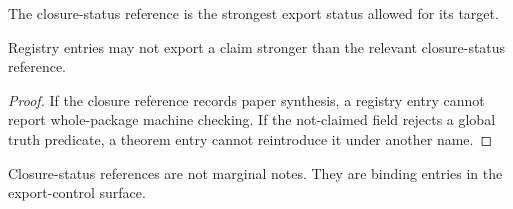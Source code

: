 \begin{definition}
\label{def:philosophy-closure-status-bound}
The closure-status reference is the strongest export status allowed
for its target.
\end{definition}

\begin{theorem}
\label{thm:philosophy-closure-status-bounds-registry}
Registry entries may not export a claim stronger than the relevant
closure-status reference.
\end{theorem}
\begin{proof}
If the closure reference records paper synthesis, a registry entry
cannot report whole-package machine checking. If the not-claimed field
rejects a global truth predicate, a theorem entry cannot reintroduce
it under another name.
\end{proof}

\begin{corollary}
\label{cor:philosophy-closure-references-belong-registry-layer}
Closure-status references are not marginal notes. They are binding
entries in the export-control surface.
\end{corollary}

